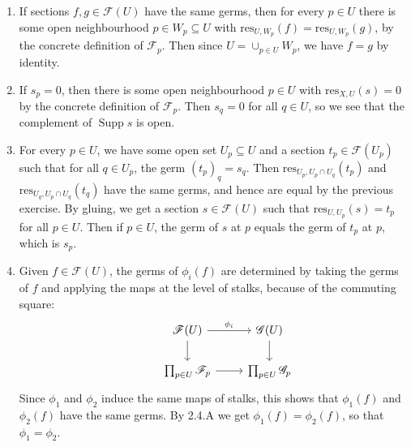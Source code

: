 \documentclass{report}
\newcommand{\res}{{\mathrm{res}}} %
\newcommand{\scrF}{\mathscr{F}}
\newcommand{\scrG}{\mathscr{G}}
\DeclareMathOperator{\Supp}{Supp}
\begin{document}
\begin{enumerate}[label=\textbf{2.4.\Alph*.}]
	\item If sections $f,g\in\scrF(U)$ have the same germs, then for every $p\in U$
	      there is some open neighbourhood $p\in W_p\subseteq U$ with
	      $\res_{U,W_p}(f)=\res_{U,W_p}(g)$, by the concrete definition of $\scrF_p$.
	      Then since $U=\cup_{p\in U}W_p$, we have $f=g$ by identity.

	\item If $s_p=0$, then there is some open neighbourhood $p\in U$ with
	      $\res_{X,U}(s)=0$ by the concrete definition of $\scrF_p$. Then $s_q=0$ for
	      all $q\in U$, so we see that the complement of $\Supp s$ is open.

	\item For every $p\in U$, we have some open set $U_p\subseteq U$ and a
	      section $t_p\in\scrF(U_p)$ such that for all $q\in U_p$, the germ
	      $(t_p)_q=s_q$. Then $\res_{U_p,U_p\cap U_q}(t_p)$ and
	      $\res_{U_q,U_p\cap U_q}(t_q)$ have the same germs, and hence are equal
	      by the previous exercise. By gluing, we get a section $s\in\scrF(U)$ such
	      that $\res_{U,U_p}(s)=t_p$ for all $p\in U$. Then if $p\in U$, the germ
	      of $s$ at $p$ equals the germ of $t_p$ at $p$, which is $s_p$.

	\item Given $f\in\scrF(U)$, the germs of $\phi_i(f)$ are determined by taking
	      the germs of $f$ and applying the maps at the level of stalks, because
	      of the commuting square:
	      \begin{equation*}
		      \begin{tikzcd}
			      &\scrF(U) \arrow{r}{\phi_i} \arrow{d}
			      &\scrG(U) \arrow{d} \\
			      &\prod_{p\in U}\scrF_p \arrow{r}
			      &\prod_{p\in U}\scrG_p
		      \end{tikzcd}
	      \end{equation*}
	      Since $\phi_1$ and $\phi_2$ induce the same maps of stalks, this shows
	      that $\phi_1(f)$ and $\phi_2(f)$ have the same germs. By 2.4.A we get
	      $\phi_1(f)=\phi_2(f)$, so that $\phi_1=\phi_2$.


\end{enumerate}
\end{document}
